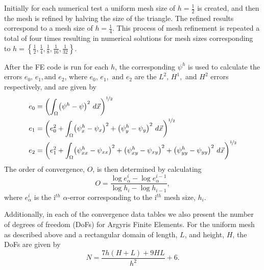 Initially for each numerical test a uniform mesh size of $h=\frac{1}{2}$ is created, and then the mesh
is refined by halving the size of the triangle. The refined results correspond to a mesh size of $h=\frac{1}{4}$.  This
process of mesh refinement is repeated a total of four times resulting in numerical solutions for mesh sizes
corresponding to $h=\left\{\frac{1}{2},\frac{1}{4},\frac{1}{8},\frac{1}{16},\frac{1}{32}\right\}$. 
%

After the FE code is run for each $h$, the corresponding $\psi^h$ is used to calculate the errors $e_0,\, e_1,\text{
and } e_2$, where $e_0,\, e_1,\text{ and } e_2$ are the $L^2,\, H^1,$ and $H^2$ errors respectively, and are
given by 
\begin{align*}
  e_0 &= \left(\int_{\Omega}\!\left( \psi^h - \psi \right)^2 \,d\vec{x}\right)^{\nicefrac{1}{2}}\\
  e_1 &= \left(e_0^2 + \int_{\Omega}\!  \left( \psi^h_x - \psi_x \right)^2 + \left( \psi^h_y - \psi_y \right)^2
    \,d\vec{x}\right)^{\nicefrac{1}{2}}\\
  e_2 &= \left(e_1^2 + \int_{\Omega}\!  \left( \psi^h_{xx} - \psi_{xx} \right)^2 + \left( \psi^h_{xy} - \psi_{xy}
    \right)^2 + \left( \psi^h_{yy} - \psi_{yy} \right)^2 \,d\vec{x}\right)^{\nicefrac{1}{2}}\\
\end{align*}
The order of convergence, $O$, is then determined by calculating 
\begin{equation*}
  O = \dfrac{\log e_{\alpha}^i - \log e_{\alpha}^{i-1}}{\log h_i - \log h_{i-1}},
\end{equation*}
where $e_{\alpha}^i$ is the i$^{th}$ $\alpha$-error corresponding to the i$^{th}$ mesh size, $h_i$. 

Additionally, in each of the convergence data tables we also present the number of degrees of freedom (DoFs) for Argyris
Finite Elements. For the uniform mesh as described above and a rectangular domain of length, $L$, and height, $H$, the
DoFs are given by
\begin{equation*}
  N = \frac{7h\left(H + L\right) + 9 H L}{h^2} + 6.
\end{equation*}

